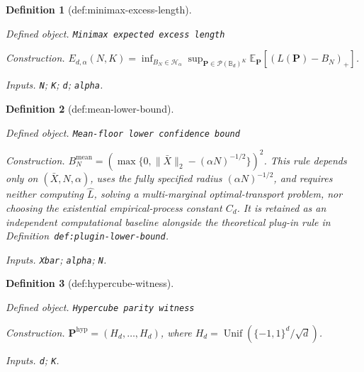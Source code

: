 \documentclass{article}
\newtheorem{definition}{Definition}
\begin{document}
\begin{definition}[def:minimax-excess-length]\label{def:minimax-excess-length}
\par\smallskip\noindent\emph{Defined object.} \texttt{Minimax expected excess length}
\par\smallskip\noindent\emph{Construction.} \(E_{d,\alpha}(N,K)=\inf_{B_N\in\mathcal H_\alpha}\sup_{\mathbf P\in\mathcal P(\mathbb B_d)^K}\mathbb E_{\mathbf P}[(L(\mathbf P)-B_N)_+]\).
\par\smallskip\noindent\emph{Inputs.} \texttt{N}; \texttt{K}; \texttt{d}; \texttt{alpha}.
\end{definition}

\begin{definition}[def:mean-lower-bound]\label{def:mean-lower-bound}
\par\smallskip\noindent\emph{Defined object.} \texttt{Mean-\allowbreak{}floor lower confidence bound}
\par\smallskip\noindent\emph{Construction.} \(B_N^{\mathrm{mean}}=(\max\{0,\|\bar X\|_2-(\alpha N)^{-1/2}\})^2\). This rule depends only on \((\bar X,N,\alpha)\), uses the fully specified radius \((\alpha N)^{-1/2}\), and requires neither computing \(\widehat L\), solving a multi-marginal optimal-transport problem, nor choosing the existential empirical-process constant \(C_d\). It is retained as an independent computational baseline alongside the theoretical plug-in rule in Definition~\texttt{def:plugin-lower-bound}.
\par\smallskip\noindent\emph{Inputs.} \texttt{Xbar}; \texttt{alpha}; \texttt{N}.
\end{definition}

\begin{definition}[def:hypercube-witness]\label{def:hypercube-witness}
\par\smallskip\noindent\emph{Defined object.} \texttt{Hypercube parity witness}
\par\smallskip\noindent\emph{Construction.} \(\mathbf P^{\mathrm{hyp}}=(H_d,\ldots,H_d)\), where \(H_d=\operatorname{Unif}(\{-1,1\}^d/\sqrt d)\).
\par\smallskip\noindent\emph{Inputs.} \texttt{d}; \texttt{K}.
\end{definition}
\end{document}
